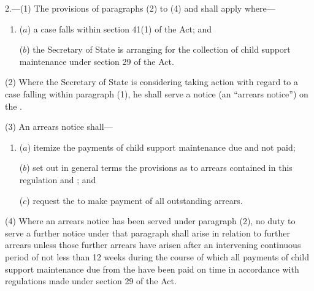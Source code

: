 \documentclass[12pt,a4paper]{article}
\begin{document}
2.—(1) The provisions of paragraphs (2) to (4) and 
shall apply where—
\begin{enumerate}\item[]
($a$) a case falls within section 41(1) of the Act; and

($b$) the Secretary of State is arranging for the collection of child support maintenance under section 29 of the Act.
\end{enumerate}

(2) Where the Secretary of State is considering taking action with regard to a case falling within paragraph (1), he shall serve a notice (an “arrears notice”) on the 
.  %

(3) An arrears notice shall—
\begin{enumerate}\item[]
($a$) itemize the payments of child support maintenance due and not paid;

($b$) set out in general terms the provisions as to arrears 
contained in this regulation and %
; and

($c$) request the 
to make payment of all outstanding arrears.
\end{enumerate}

(4) Where an arrears notice has been served under paragraph (2), no duty to serve a further notice under that paragraph shall arise in relation to further arrears unless those further arrears have arisen after an intervening continuous period of not less than 12 weeks during the course of which all payments of child support maintenance due from the 
have been paid on time in accordance with regulations made under section 29 of the Act.
\end{document}
